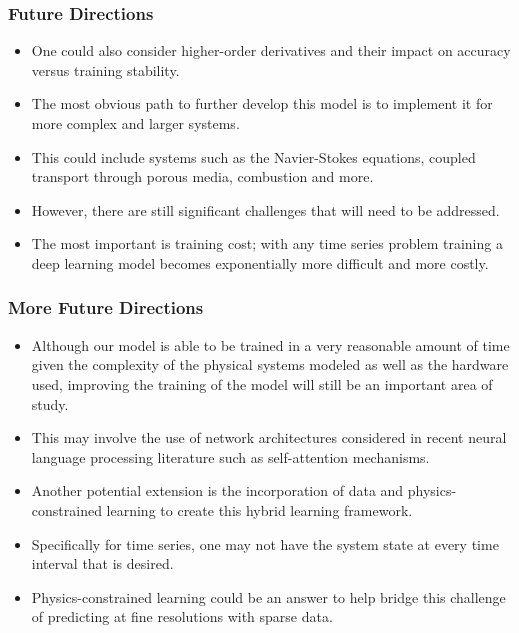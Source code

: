 \documentclass{beamer}
\theoremstyle{remark}
\begin{document}
\begin{frame}
\frametitle{Future Directions}

\begin{itemize}

\item{One could also consider higher-order derivatives and their impact on accuracy versus training stability.}

\item{The most obvious path to further develop this model is to implement it for more complex and larger systems.}

\item{This could include systems such as the Navier-Stokes equations, coupled transport through porous media, combustion and more.}

\item{However, there are still significant challenges that will need to be addressed.}

\item{The most important is training cost; with any time series problem training a deep learning model becomes exponentially more difficult and more costly.}

\end{itemize}
\end{frame}


\begin{frame}
\frametitle{More Future Directions}

\begin{itemize}

\item{Although our model is able to be trained in a very reasonable amount of time given the complexity of the physical systems modeled as well as the hardware used, improving the training of the model will still be an important area of study.}

\item{This may involve the use of network architectures considered in recent neural language processing literature such as self-attention mechanisms.}

\item{Another potential extension is the incorporation of data and physics-constrained learning to create this hybrid learning framework.}

\item{Specifically for time series, one may not have the system state at every time interval that is desired.}

\item{Physics-constrained learning could be an answer to help bridge this challenge of predicting at fine resolutions with sparse data.}


\end{itemize}
\end{frame}


\end{document}
